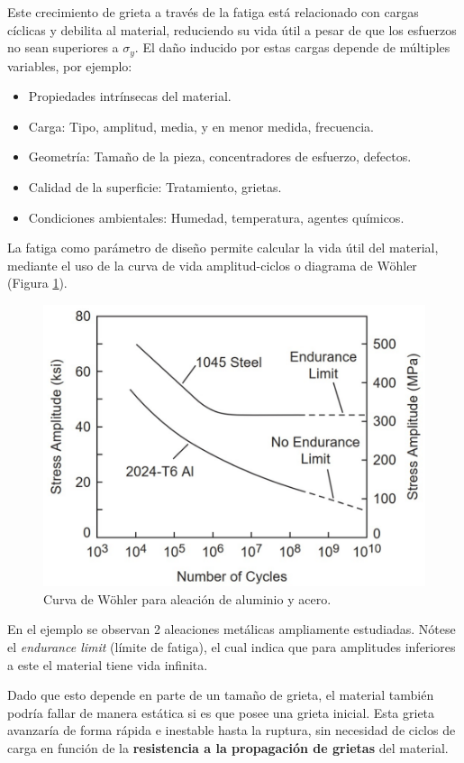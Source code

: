 Este crecimiento de grieta a través de la fatiga está relacionado con cargas cíclicas y debilita al material, reduciendo su vida útil a pesar de que los esfuerzos no sean superiores a $\sigma_{y}$. El daño inducido por estas cargas depende de múltiples variables, por ejemplo:

\begin{itemize}
    \item Propiedades intrínsecas del material.
    \item Carga: Tipo, amplitud, media, y en menor medida, frecuencia.
    \item Geometría: Tamaño de la pieza, concentradores de esfuerzo, defectos.
    \item Calidad de la superficie: Tratamiento, grietas.
    \item Condiciones ambientales: Humedad, temperatura, agentes químicos.
\end{itemize}

La fatiga como parámetro de diseño permite calcular la vida útil del material, mediante el uso de la curva de vida amplitud-ciclos o diagrama de Wöhler (Figura \ref{fig:4}).

\begin{figure}[h!]
    \centering
    \includegraphics[width=0.7\linewidth]{imgs/sn.png}
    \caption{Curva de Wöhler para aleación de aluminio y acero.}
    \label{fig:4}
\end{figure}

En el ejemplo se observan 2 aleaciones metálicas ampliamente estudiadas. Nótese el \textit{endurance limit} (límite de fatiga), el cual indica que para amplitudes inferiores a este el material tiene vida infinita.

Dado que esto depende en parte de un tamaño de grieta, el material también podría fallar de manera estática si es que posee una grieta inicial. Esta grieta avanzaría de forma rápida e inestable hasta la ruptura, sin necesidad de ciclos de carga en función de la \textbf{resistencia a la propagación de grietas} del material.

